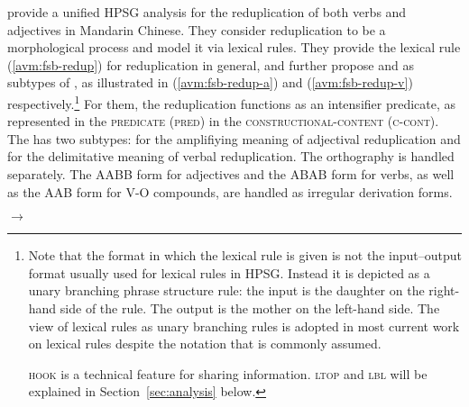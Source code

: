  
 
 
 
 
 
\citet*{FanSongBond2015} provide a unified HPSG analysis for the reduplication of both verbs and adjectives in Mandarin Chinese.
They consider reduplication to be a morphological process and model it via lexical rules.
They provide the lexical rule (\ref{avm:fsb-redup}) for reduplication in general,
and further propose  and  as subtypes of , 
as illustrated in (\ref{avm:fsb-redup-a}) and (\ref{avm:fsb-redup-v}) respectively.\footnote{%
  Note that the format in which the lexical rule is given is not the input--output format usually
  used for lexical rules in HPSG. Instead it is depicted as a unary branching phrase structure
  rule: the input is the daughter on the right-hand side of the rule. The output is the mother on
  the left-hand side. The view of lexical rules as unary branching rules is adopted in most current work on
  lexical rules \citep{BC99a,Meurers2001a} despite the notation that is commonly assumed.  

  \textsc{hook} is a technical feature for sharing information. \textsc{ltop} and \textsc{lbl} will
  be explained in Section~\ref{sec:analysis} below.
}
For them, the reduplication functions as an intensifier predicate, as represented in the \textsc{predicate (pred)} in the \textsc{constructional-content (c-cont)}.
The  has two subtypes:  for the amplifiying meaning of adjectival reduplication and  for the delimitative meaning of verbal reduplication.
The orthography is handled separately.
The AABB form for adjectives and the ABAB form for verbs, as well as the AAB form for V-O compounds, are handled as irregular derivation forms.


\ea\label{avm:fsb-redup}
$\to$
\z


